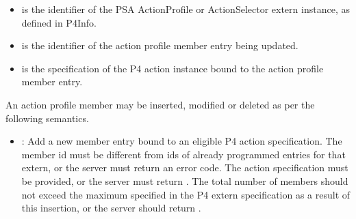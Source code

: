 \documentclass[11pt]{article}
\begin{document}
{%
\begin{itemize}%

\item{}
 is the  identifier of the PSA ActionProfile or
ActionSelector extern instance, as defined in P4Info.%

\item{}
 is the  identifier of the action profile member entry
being updated.%

\item{}
 is the specification of the P4 action instance bound to the action
profile member entry.%
\end{itemize}%

\noindent{}An action profile member may be inserted, modified or deleted as per the
following semantics.%

\begin{itemize}[noitemsep,topsep=\mdcompacttopsep]%

\item{}: Add a new member entry bound to an eligible P4 action
specification. The member id must be different from ids of already programmed
entries for that extern, or the server must return an  error
code. The action specification must be provided, or the server must return
. The total number of members should not exceed the maximum
specified in the P4 extern specification as a result of this insertion, or the
server should return .%


\end{itemize}}
\end{document}
